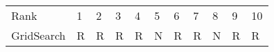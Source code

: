 \begin{tabular}{lllllllllll}
Rank & 1 & 2 & 3 & 4 & 5 & 6 & 7 & 8 & 9 & 10 \\
GridSearch & R & R & R & R & N & R & R & N & R & R \\
\end{tabular}
